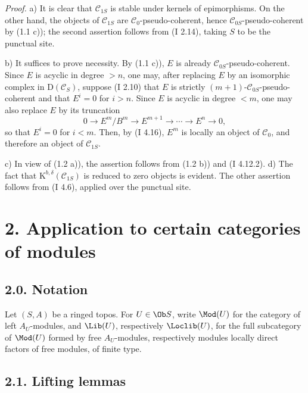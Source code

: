 \documentclass[11pt]{article}
\begin{document}
\emph{Proof.} a) It is clear that $\mathcal C_{1S}$ is stable under kernels of epimorphisms. On the other hand, the objects of $\mathcal C_{1S}$ are $\mathcal C_0$-pseudo-coherent, hence $\mathcal C_{0S}$-pseudo-coherent by (1.1 c)); the second assertion follows from (I 2.14), taking $S$ to be the punctual site.

b) It suffices to prove necessity. By (1.1 c)), $E$ is already $\mathcal C_{0S}$-pseudo-coherent. Since $E$ is acyclic in degree $>n$, one may, after replacing $E$ by an isomorphic complex in $\mathrm D(\mathcal C_S)$, suppose (I 2.10) that $E$ is strictly $(m+1)$-$\mathcal C_{0S}$-pseudo-coherent and that $E^i=0$ for $i>n$. Since $E$ is acyclic in degree $<m$, one may also replace $E$ by its truncation
\[
0\longrightarrow E^m/B^m\longrightarrow E^{m+1}\longrightarrow\cdots\longrightarrow E^n\longrightarrow0,
\]
so that $E^i=0$ for $i<m$. Then, by (I 4.16), $E^m$ is locally an object of $\mathcal C_0$, and therefore an object of $\mathcal C_{1S}$.

c) In view of (1.2 a)), the assertion follows from (1.2 b)) and (I 4.12.2). d) The fact that $\mathrm K^{b,\delta}(\mathcal C_{1S})$ is reduced to zero objects is evident. The other assertion follows from (I 4.6), applied over the punctual site.

\section*{2. Application to certain categories of modules}

\subsection*{2.0. Notation}
Let $(S,A)$ be a ringed topos. For $U\in\Ob S$, write $\Mod(U)$ for the category of left $A_U$-modules, and $\Lib(U)$, respectively $\Loclib(U)$, for the full subcategory of $\Mod(U)$ formed by free $A_U$-modules, respectively modules locally direct factors of free modules, of finite type.

\subsection*{2.1. Lifting lemmas}
\end{document}
